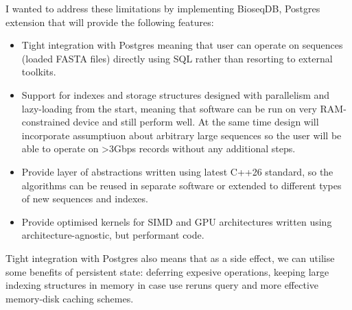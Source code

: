 I wanted to address these limitations by implementing BioseqDB, Postgres extension that will provide the following features:
\begin{itemize}
  \item Tight integration with Postgres meaning that user can operate on sequences (loaded FASTA files) directly using SQL rather than resorting to external toolkits.
  \item Support for indexes and storage structures designed with parallelism and lazy-loading from the start, meaning that software can be run on very RAM-constrained device and still perform well. At the same time design will incorporate assumptiuon about arbitrary large sequences so the user will be able to operate on >3Gbps records without any additional steps.
  \item Provide layer of abstractions written using latest C++26 standard, so the algorithms can be reused in separate software or extended to different types of new sequences and indexes.
  \item Provide optimised kernels for SIMD and GPU architectures written using architecture-agnostic, but performant code.
\end{itemize}

Tight integration with Postgres also means that as a side effect, we can utilise some benefits of persistent state: deferring expesive operations, keeping large indexing structures in memory in case use reruns query and more effective memory-disk caching schemes. 


\clearpage
\flushbottom
